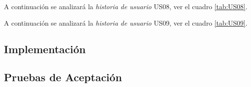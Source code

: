   

  


A continuación se analizará la \emph{historia de usuario} US08, ver el cuadro \ref{tab:US08}.

  

  


  A continuación se analizará la \emph{historia de usuario} US09, ver el cuadro \ref{tab:US09}.

    

    


    

    \subsection{Implementación}

    

  \subsection{Pruebas de Aceptación}


    

    
